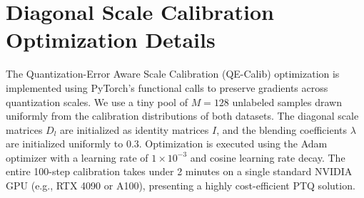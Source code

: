 \documentclass{article}
\theoremstyle{plain}
\theoremstyle{definition}
\theoremstyle{remark}
\begin{document}
\section{Diagonal Scale Calibration Optimization Details}
\label{app:calibration}

The Quantization-Error Aware Scale Calibration (QE-Calib) optimization is implemented using PyTorch's functional calls to preserve gradients across quantization scales.
We use a tiny pool of $M = 128$ unlabeled samples drawn uniformly from the calibration distributions of both datasets.
The diagonal scale matrices $D_l$ are initialized as identity matrices $I$, and the blending coefficients $\lambda$ are initialized uniformly to $0.3$.
Optimization is executed using the Adam optimizer with a learning rate of $1 \times 10^{-3}$ and cosine learning rate decay. The entire 100-step calibration takes under 2 minutes on a single standard NVIDIA GPU (e.g., RTX 4090 or A100), presenting a highly cost-efficient PTQ solution.
\end{document}
